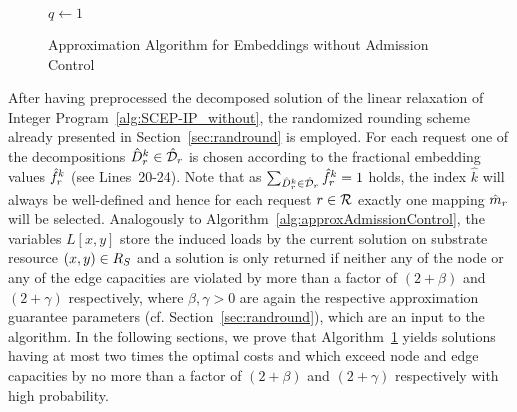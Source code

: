 \documentclass[10pt, conference, letterpaper]{IEEEtran}
\begin{document}
\begin{figure}[tbhp]
{\begin{minipage}{1.07\columnwidth}
\begin{algorithm*}[H]
\SET $q \gets 1$\\
\KwRet{\NULL}

\caption{Approximation Algorithm for Embeddings without Admission Control}
\label{alg:approxWithoutAdmissionControl}
\end{algorithm*}
\endgroup
\end{minipage}
 }
\end{figure}



After having preprocessed the decomposed solution of the linear relaxation of Integer Program~\ref{alg:SCEP-IP_without}, the randomized rounding scheme already presented in Section~\ref{sec:randround} is employed. For each request one of the decompositions $\decompHat \in \PotEmbeddingsHat$ is chosen according to the fractional embedding values $\probHat$ (see Lines~20-24). Note that as $\sum_{\decompHat \in \PotEmbeddingsHat} \probHat = 1$ holds, the index $\hat{k}$ will always be well-defined and hence for each request $r \in \mathcal{R}$ exactly one mapping $\hat{m}_{r}$ will be selected. Analogously to Algorithm~\ref{alg:approxAdmissionControl}, the variables $L[x,y]$ store the induced loads by the current solution on substrate resource $(x,y) \in  R_{S}$ and a solution is only returned if neither any of the  node or any of the edge capacities are violated by more than a factor of $(2+\beta)$ and $(2+\gamma)$ respectively, where $\beta, \gamma > 0$ are again the respective approximation guarantee parameters (cf. Section~\ref{sec:randround}), which are an input to the algorithm. In the following sections, we prove that Algorithm~\ref{alg:approxWithoutAdmissionControl} yields solutions having at most two times the optimal costs and which exceed node and edge capacities  by no more than a factor of $(2+\beta)$ and $(2+\gamma)$ respectively with high probability.
\end{document}

